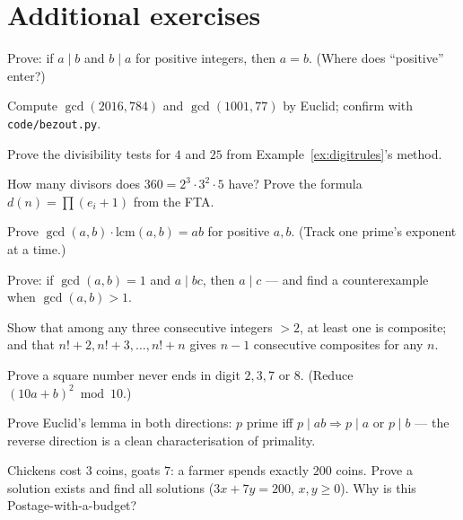 \section{Additional exercises}
\begin{exercise}[easy]
Prove: if $a \mid b$ and $b \mid a$ for positive integers, then $a = b$.
(Where does ``positive'' enter?)
\end{exercise}
\begin{exercise}[easy]
Compute $\gcd(2016, 784)$ and $\gcd(1001, 77)$ by Euclid; confirm with
\texttt{code/bezout.py}.
\end{exercise}
\begin{exercise}[easy]
Prove the divisibility tests for $4$ and $25$ from
Example~\ref{ex:digitrules}'s method.
\end{exercise}
\begin{exercise}[easy]
How many divisors does $360 = 2^3\cdot3^2\cdot5$ have? Prove the formula
$d(n) = \prod (e_i + 1)$ from the FTA.
\end{exercise}
\begin{exercise}[medium]
Prove $\gcd(a, b) \cdot \mathrm{lcm}(a, b) = ab$ for positive $a, b$.
(Track one prime's exponent at a time.)
\end{exercise}
\begin{exercise}[medium]
Prove: if $\gcd(a, b) = 1$ and $a \mid bc$, then $a \mid c$ --- and find a
counterexample when $\gcd(a,b) > 1$.
\end{exercise}
\begin{exercise}[medium]
Show that among any three consecutive integers $> 2$, at least one is
composite; and that $n! + 2, n! + 3, \dots, n! + n$ gives $n - 1$
consecutive composites for any $n$.
\end{exercise}
\begin{exercise}[medium]
Prove a square number never ends in digit $2, 3, 7$ or $8$. (Reduce
$(10a + b)^2 \bmod 10$.)
\end{exercise}
\begin{exercise}[hard]
Prove Euclid's lemma in both directions: $p$ prime iff
$p \mid ab \Rightarrow p \mid a$ or $p \mid b$ --- the reverse direction is
a clean characterisation of primality.
\end{exercise}
\begin{exercise}[hard]
Chickens cost $3$ coins, goats $7$: a farmer spends exactly $200$ coins.
Prove a solution exists and find all solutions ($3x + 7y = 200$, $x, y \ge
0$). Why is this Postage-with-a-budget?
\end{exercise}
